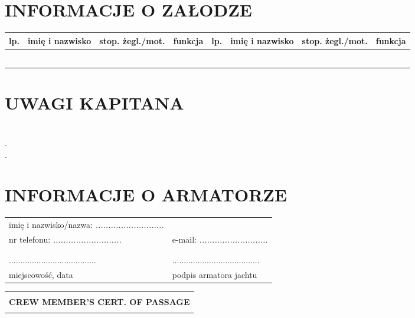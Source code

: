 \documentclass{article}
\begin{document}
\section*{INFORMACJE O ZAŁODZE}
    \begin{tabular}{|m{}|m{}|m{}|m{}||m{}|m{}|m{}|m{}|}
    \hline
    lp. & imię i nazwisko & stop. żegl./mot. & funkcja & lp. & imię i nazwisko &stop. żegl./mot. & funkcja\\
    \hline
    
&&&&&&&\\
\hline
&&&&&&&\\
\hline
&&&&&&&\\
\hline
&&&&&&&\\
\hline
&&&&&&&\\
\hline
&&&&&&&\\
\hline

    \end{tabular}
    
    
\section*{UWAGI KAPITANA}


\textit{}\dotfill \\
.\dotfill \\
.\dotfill \\
\section*{INFORMACJE O ARMATORZE}

\begin{tabularx}{\textwidth}{X X}
imię i nazwisko/nazwa: \textit{...........................} \\
nr telefonu: \textit{...........................} & e-mail: \textit{...........................}\\
\\\\
...................................... & ......................................\\
miejscowość, data & podpis armatora jachtu\\
\end{tabularx}
\newpage
\begin{tabularx}{\textwidth} { 
  | >{\centering\arraybackslash}X | }
 \hline
 \\
 \textbf{\huge CREW MEMBER'S CERT. OF PASSAGE} \\
 \\
\hline
\end{tabularx}
\end{document}
